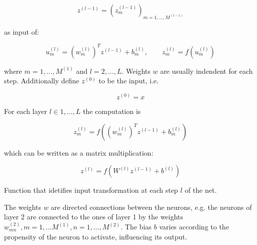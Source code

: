\begin{Equation}[H]
	\centering
	\begin{equation}
	z^{(l-1)} = (z^{(l-1)}_m)_{m=1,...,M^{(l-1)}}
	\end{equation}
	\label{eq:hommatrix}
\end{Equation}

\noindent as input of:

\begin{Equation}[H]
	\centering
	\begin{equation}
		u^{(l)}_m = (w^{(l)}_m)^T z^{(l-1)} + b^{(l)}_m,  
		\quad \quad
		z^{(l)}_m = f(u^{(l)}_m)
	\end{equation}
	\label{eq:hommatrix}
\end{Equation}

\noindent where $m=1,...,M^{(1)}$ and $l=2,...,L$. Weights $w$ are usually indendent for each step. Additionally define $z^{(0)}$ to be the input, i.e.

\begin{Equation}[H]
	\centering
	\begin{equation}
	z^{(0)} = x
	\end{equation}
	\label{eq:hommatrix}
\end{Equation}

\noindent For each layer $l \in 1,...,L$ the computation is

\begin{Equation}[H]
	\centering
	\begin{equation}
		z^{(l)}_m = f( (w^{(l)}_m)^T z^{(l-1)} + b^{(l)}_m)
	\end{equation}
	\label{eq:mathmodel}
\end{Equation}

\noindent which can be written as a matrix multiplication:

\begin{Equation}[H]
	\centering
	\begin{equation}
		z^{(l)} = f( W^{(l)} z^{(l-1)} + b^{(l)})
	\end{equation}
	\caption[Forward propagation.]{Function that idetifies input transformation at each step $l$ of the net.}
	\label{eq:activationfun}
\end{Equation}

\noindent The weights $w$ are directed connections between the neurons, e.g. the neurons of layer 2 are connected to the ones of layer 1 by the weights $w^{(2)}_{mn}, m=1,...M^{(1)}, n=1,...,M^{(2)}$. The bias $b$ varies according to the propensity of the neuron to activate, influencing its output. 

